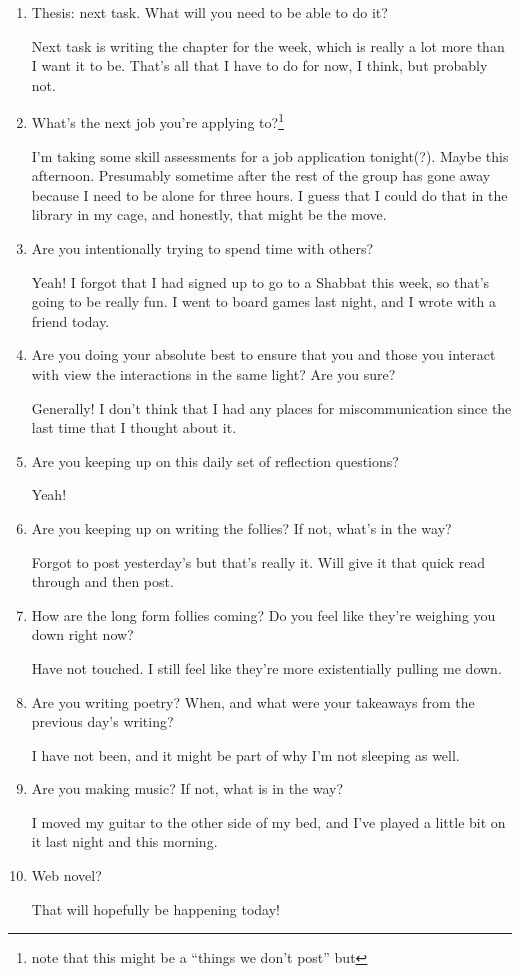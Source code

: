 \documentclass[12pt]{article}
\newcommand{\say}[1]{``#1''}
\renewcommand{\,}{\textsuperscript{,}}
\begin{document}
\begin{enumerate}
\item Thesis: next task. What will you need to be able to do it?

Next task is writing the chapter for the week, which is really a lot more than I want it to be.  
That's all that I have to do for now, I think, but probably not.

\item What's the next job you're applying to?\footnote{note that this might be a \say{things we don't post} but}

I'm taking some skill assessments for a job application tonight(?). Maybe this afternoon. Presumably sometime after the rest of the group has gone away because I need to be alone for three hours. I guess that I could do that in the library in my cage, and honestly, that might be the move.

\item Are you intentionally trying to spend time with others?

Yeah! I forgot that I had signed up to go to a Shabbat this week, so that's going to be really fun.  
I went to board games last night, and I wrote with a friend today.

\item Are you doing your absolute best to ensure that you and those you interact with view the interactions in the same light? Are you sure?

Generally! I don't think that I had any places for miscommunication since the last time that I thought about it.

\item Are you keeping up on this daily set of reflection questions?

Yeah!

\item Are you keeping up on writing the follies? If not, what's in the way?

Forgot to post yesterday's but that's really it. Will give it that quick read through and then post.

\item How are the long form follies coming? Do you feel like they're weighing you down right now?

Have not touched. I still feel like they're more existentially pulling me down.

\item Are you writing poetry? When, and what were your takeaways from the previous day's writing?

I have not been, and it might be part of why I'm not sleeping as well.

\item Are you making music? If not, what is in the way?

I moved my guitar to the other side of my bed, and I've played a little bit on it last night and this morning.

\item Web novel?

That will hopefully be happening today!

\end{enumerate}
\end{document}
